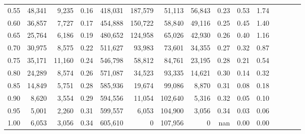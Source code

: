 \begin{tabular}{rrrcrrrrrrrrrrr}
0.55 &  48,341 &   9,235 &                                       0.16 &  418,031 &  187,579 &   51,113 &   56,843 &  0.23 &  0.53 &                         1.74 \\
0.60 &  36,857 &   7,727 &                                       0.17 &  454,888 &  150,722 &   58,840 &   49,116 &  0.25 &  0.45 &                         1.40 \\
0.65 &  25,764 &   6,186 &                                       0.19 &  480,652 &  124,958 &   65,026 &   42,930 &  0.26 &  0.40 &                         1.16 \\
0.70 &  30,975 &   8,575 &                                       0.22 &  511,627 &   93,983 &   73,601 &   34,355 &  0.27 &  0.32 &                         0.87 \\
0.75 &  35,171 &  11,160 &                                       0.24 &  546,798 &   58,812 &   84,761 &   23,195 &  0.28 &  0.21 &                         0.54 \\
0.80 &  24,289 &   8,574 &                                       0.26 &  571,087 &   34,523 &   93,335 &   14,621 &  0.30 &  0.14 &                         0.32 \\
0.85 &  14,849 &   5,751 &                                       0.28 &  585,936 &   19,674 &   99,086 &    8,870 &  0.31 &  0.08 &                         0.18 \\
0.90 &   8,620 &   3,554 &                                       0.29 &  594,556 &   11,054 &  102,640 &    5,316 &  0.32 &  0.05 &                         0.10 \\
0.95 &   5,001 &   2,260 &                                       0.31 &  599,557 &    6,053 &  104,900 &    3,056 &  0.34 &  0.03 &                         0.06 \\
1.00 &   6,053 &   3,056 &                                       0.34 &  605,610 &        0 &  107,956 &        0 &   nan &  0.00 &                         0.00 \\
\bottomrule
\end{tabular}
